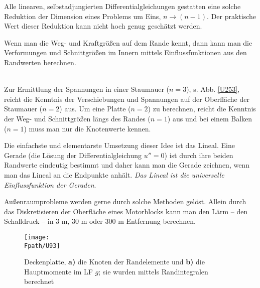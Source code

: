 {{{{Alle linearen, selbstadjungierten Differentialgleichungen gestatten eine solche Reduktion der Dimension eines Problems um Eins, $n \to (n-1)$. Der praktische Wert dieser Reduktion kann nicht hoch genug gesch\"{a}tzt werden.\\

\hspace*{-12pt}\colorbox{highlightBlue}{\parbox{0.98\textwidth}{Wenn man die Weg- und Kraftgr\"{o}{\ss}en auf dem Rande kennt, dann kann man die Verformungen und Schnittgr\"{o}{\ss}en im Innern mittels Einflussfunktionen aus den Randwerten berechnen.}}
\\

Zur Ermittlung der Spannungen in einer Staumauer ($n = 3$), s. Abb. \ref{U253}, reicht die Kenntnis der Verschiebungen und Spannungen auf der Oberfl\"{a}che der Staumauer ($n = 2$) aus. Um eine Platte ($n = 2$) zu berechnen, reicht die Kenntnis der Weg- und Schnittgr\"{o}{\ss}en l\"{a}ngs des Randes ($n = 1$) aus und bei einem Balken ($n = 1$) muss man nur die Knotenwerte kennen.

Die einfachste und elementarste Umsetzung dieser Idee ist das Lineal. Eine Gerade (die L\"{o}sung der Differentialgleichung $u'' = 0$) ist durch ihre beiden Randwerte eindeutig bestimmt und daher kann man die Gerade zeichnen, wenn man das Lineal an die Endpunkte anh\"{a}lt. {\em Das Lineal ist die universelle Einflussfunktion der Geraden\/}.

Au{\ss}enraumprobleme werden gerne durch solche Methoden gel\"{o}st. Allein durch das Diskretisieren der Oberfl\"{a}che eines Motorblocks kann man den L\"{a}rm -- den Schalldruck -- in 3 m, 30 m oder 300 m Entfernung berechnen.

\begin{figure}[tbp]
\centering
\if {} \sidecaption \fi
\texttt{[image: \\Fpath/U93]}
\caption{Deckenplatte,  \textbf{ a)} die Knoten der Randelemente und  \textbf{ b)} die Hauptmomente im LF $g$; sie wurden mittels Randintegralen berechnet} \label{U93}
\end{figure}

}}}}
